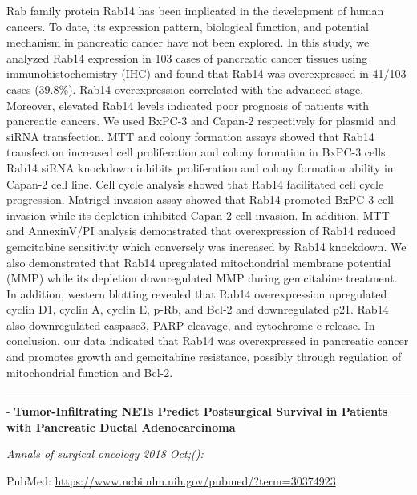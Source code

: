 \documentclass[]{article}
\begin{document}
Rab family protein Rab14 has been implicated in the development of human
cancers. To date, its expression pattern, biological function, and
potential mechanism in pancreatic cancer have not been explored. In this
study, we analyzed Rab14 expression in 103 cases of pancreatic cancer
tissues using immunohistochemistry (IHC) and found that Rab14 was
overexpressed in 41/103 cases (39.8\%). Rab14 overexpression correlated
with the advanced stage. Moreover, elevated Rab14 levels indicated poor
prognosis of patients with pancreatic cancers. We used BxPC-3 and
Capan-2 respectively for plasmid and siRNA transfection. MTT and colony
formation assays showed that Rab14 transfection increased cell
proliferation and colony formation in BxPC-3 cells. Rab14 siRNA
knockdown inhibits proliferation and colony formation ability in Capan-2
cell line. Cell cycle analysis showed that Rab14 facilitated cell cycle
progression. Matrigel invasion assay showed that Rab14 promoted BxPC-3
cell invasion while its depletion inhibited Capan-2 cell invasion. In
addition, MTT and AnnexinV/PI analysis demonstrated that overexpression
of Rab14 reduced gemcitabine sensitivity which conversely was increased
by Rab14 knockdown. We also demonstrated that Rab14 upregulated
mitochondrial membrane potential (MMP) while its depletion downregulated
MMP during gemcitabine treatment. In addition, western blotting revealed
that Rab14 overexpression upregulated cyclin D1, cyclin A, cyclin E,
p-Rb, and Bcl-2 and downregulated p21. Rab14 also downregulated
caspase3, PARP cleavage, and cytochrome c release. In conclusion, our
data indicated that Rab14 was overexpressed in pancreatic cancer and
promotes growth and gemcitabine resistance, possibly through regulation
of mitochondrial function and Bcl-2.

{}

{}

\begin{center}\rule{0.5\linewidth}{\linethickness}\end{center}

 - \textbf{Tumor-Infiltrating NETs Predict Postsurgical Survival in
Patients with Pancreatic Ductal Adenocarcinoma}

\emph{Annals of surgical oncology 2018 Oct;():}

PubMed: \url{https://www.ncbi.nlm.nih.gov/pubmed/?term=30374923}
\end{document}
